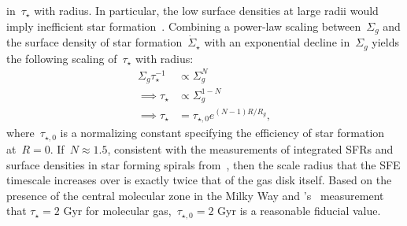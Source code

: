 in~$\tau_\star$ with radius.
In particular, the low surface densities at large radii would imply inefficient
star formation~\citep[i.e., higher~$\tau_\star$; e.g.,][]{delosReyes2019,
Kennicutt2021}.
Combining a power-law scaling between~$\Sigma_g$ and the surface density of
star formation~$\dot{\Sigma}_\star$ with an exponential decline in~$\Sigma_g$
yields the following scaling of~$\tau_\star$ with radius:
\begin{equation}\begin{split}
\Sigma_g \tau_\star^{-1} &\propto \Sigma_g^N
\\
\implies \tau_\star &\propto \Sigma_g^{1 - N}
\\
\implies \tau_\star &= \tau_{\star,0} e^{(N - 1) R / R_g},
\end{split}\end{equation}
where~$\tau_{\star,0}$ is a normalizing constant specifying the efficiency of
star formation at~$R = 0$.
If~$N \approx 1.5$, consistent with the measurements of integrated SFRs and
surface densities in star forming spirals from~\citet{Kennicutt1998}, then
the scale radius that the SFE timescale increases over is exactly twice that
of the gas disk itself.
Based on the presence of the central molecular zone in the Milky Way
\citep[e.g.,][]{Morris1996, Dahmen1998, PiercePrice2000, Hatchfield2020} and
\citeauthor{Leroy2008}'s~\citeyearpar{Leroy2008} measurement that
$\tau_\star = 2$ Gyr for molecular gas,~$\tau_{\star,0} = 2$ Gyr is a
reasonable fiducial value.

